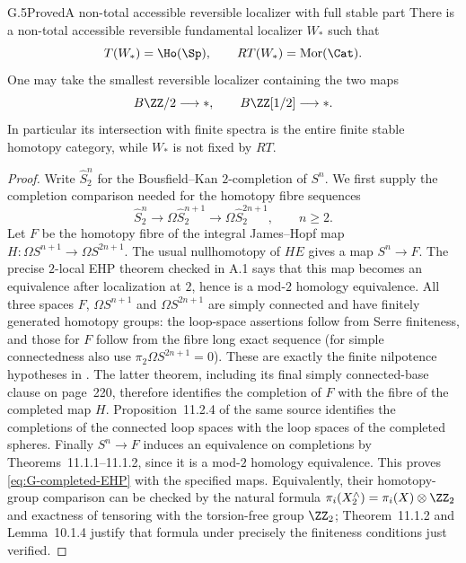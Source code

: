 \begin{claim}{G.5}{Proved}{A non-total accessible reversible localizer with full stable part}
There is a non-total accessible reversible fundamental localizer $W_*$ such that
\[
 T(W_*)=\Ho(\Sp),\qquad RT(W_*)=\operatorname{Mor}(\Cat).
\]
One may take the smallest reversible localizer containing the two maps
\[
 B\ZZ/2\longrightarrow *,\qquad B\ZZ[1/2]\longrightarrow *.
\]
In particular its intersection with finite spectra is the entire finite stable homotopy category, while $W_*$ is not fixed by $RT$.
\end{claim}
\begin{proof}
Write $\widehat S^n_2$ for the Bousfield--Kan $2$-completion of $S^n$. We first supply the completion comparison needed for the homotopy fibre sequences
\begin{equation}\label{eq:G-completed-EHP}
 \widehat S^n_2\longrightarrow\Omega\widehat S^{n+1}_2
       \longrightarrow\Omega\widehat S^{2n+1}_2,
 \qquad n\geq2.
\end{equation}
Let $F$ be the homotopy fibre of the integral James--Hopf map
$H:\Omega S^{n+1}\to\Omega S^{2n+1}$. The usual nullhomotopy of $HE$ gives a map $S^n\to F$. The precise $2$-local EHP theorem checked in A.1 says that this map becomes an equivalence after localization at $2$, hence is a mod-$2$ homology equivalence. All three spaces $F$, $\Omega S^{n+1}$ and $\Omega S^{2n+1}$ are simply connected and have finitely generated homotopy groups: the loop-space assertions follow from Serre finiteness, and those for $F$ follow from the fibre long exact sequence (for simple connectedness also use $\pi_2\Omega S^{2n+1}=0$). These are exactly the finite nilpotence hypotheses in \cite[Theorem 4.5.2 and Theorem 11.2.6]{FGHMayPonto2012}. The latter theorem, including its final simply connected-base clause on page~220, therefore identifies the completion of $F$ with the fibre of the completed map $H$. Proposition~11.2.4 of the same source identifies the completions of the connected loop spaces with the loop spaces of the completed spheres. Finally $S^n\to F$ induces an equivalence on completions by Theorems~11.1.1--11.1.2, since it is a mod-$2$ homology equivalence. This proves \eqref{eq:G-completed-EHP} with the specified maps. Equivalently, their homotopy-group comparison can be checked by the natural formula $\pi_i(X^{\wedge}_2)=\pi_i(X)\otimes\ZZ_2$ and exactness of tensoring with the torsion-free group $\ZZ_2$; Theorem~11.1.2 and Lemma~10.1.4 justify that formula under precisely the finiteness conditions just verified.


\end{proof}
